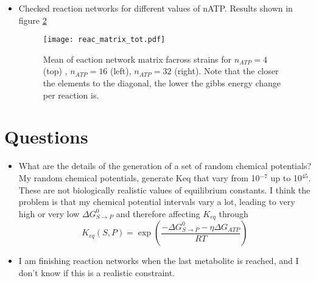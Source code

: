 \documentclass[10pt,letterpaper]{article}
\begin{document}
\begin{itemize}
    	The simulation with this parameters yields the time-series population and metabolite concentration dynamics seen in figure \ref{fig:dynamics}.
    	\begin{figure}[h]
    		\centering
    		\texttt{[image: dynamics\_example.pdf]}
    		\caption{Time series of population and concentration dynamics}
    		\label{fig:dynamics}
    	\end{figure}
    	If I run my simulation with the most energetic metabolite being $ \mu_0 =  3\cdot 10^{6}$, which is biologically more realistic, I my populations and concentrations diverge. I am currently investigating why
    	\item Checked reaction networks  for different values of nATP. Results shown in figure \ref{fig:network}
    	\begin{figure}
    		\centering
    		\texttt{[image: reac\_matrix\_tot.pdf]}
    		\caption{Mean of eaction network matrix facross strains for $ n_{ATP} = 4 $ (top) , $ n_{ATP} = 16 $ (left), $ n_{ATP} = 32 $ (right). Note that the closer the elements to the diagonal, the lower the gibbs energy change per reaction is. }
    		\label{fig:network}
    	\end{figure}
	\end{itemize}
    \section*{Questions}
	\begin{itemize}
	    \item What are the details of the generation of a set of random chemical potentials?
		My random chemical potentials, generate Keq that vary from 10$^{-7}$ up to 10$^{45}$. These are not biologically realistic values of equilibrium constants. I think the problem is that my chemical potential intervals vary a lot, leading to very high or very low $\Delta G^{0}_{S\rightarrow P}$ and therefore affecting $K_{eq}$ through\\
		\begin{equation}
			K_{eq}(S, P) = \exp\left(\frac{-\Delta G^{0}_{S\rightarrow P} - \eta\Delta G_{ATP}}{RT}\right)
		\end{equation}
		\item I am finishing reaction networks when the last metabolite is reached, and I don't know if this is a realistic constraint.
	\end{itemize}

	
\end{document}
